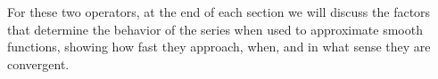 	For these two operators, at the end of each section we will discuss the factors that determine the behavior of the series when used to approximate smooth functions, showing how fast they approach, when, and in what sense they are convergent.
	
	\newpage
	  
	
	\newpage
		
